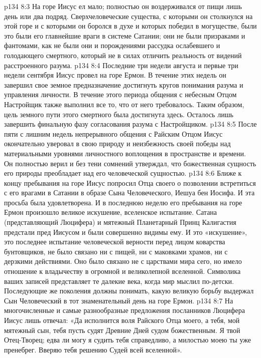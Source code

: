 \vs p134 8:3 \pc На горе Иисус ел мало; полностью он воздерживался от пищи лишь день или два подряд. Сверхчеловеческие существа, с которыми он столкнулся на этой горе и с которыми он боролся в духе и которых победил в могуществе, были  это были его главнейшие враги в системе Сатании; они не были призраками и фантомами, как не были они и порождениями рассудка ослабевшего и голодающего смертного, который не в силах отличить реальность от видений расстроенного разума.
\vs p134 8:4 Последние три недели августа и первые три недели сентября Иисус провел на горе Ермон. В течение этих недель он завершил свое земное предназначение достигнуть кругов понимания разума и управления личности. В течение этого периода общения с небесным Отцом Настройщик также выполнил все то, что от него требовалось. Таким образом, цель земного пути этого смертного была достигнута здесь. Осталось лишь завершить финальную фазу согласования разума с Настройщиком.
\vs p134 8:5 После пяти с лишним недель непрерывного общения с Райским Отцом Иисус окончательно уверовал в свою природу и неизбежность своей победы над материальными уровнями личностного воплощения в пространстве и времени. Он полностью верил и без тени сомнений утверждал, что божественная сущность его природы преобладает над его человеческой сущностью.
\vs p134 8:6 \pc Ближе к концу пребывания на горе Иисус попросил Отца своего о позволении встретиться с его врагами в Сатании в образе Сына Человеческого, Иешуа бен Иосифа. И эта просьба была удовлетворена. И в последнюю неделю его пребывания на горе Ермон произошло великое искушение, вселенское испытание. Сатана (представляющий Люцифера) и мятежный Планетарный Принц Калигастия предстали пред Иисусом и были совершенно видимы ему. И это «искушение», это последнее испытание человеческой верности перед лицом коварства бунтовщиков, не было связано ни с пищей, ни с маковками храмов, ни с дерзкими действиями. Оно было связано не с царствами мира сего, но имело отношение к владычеству в огромной и великолепной вселенной. Символика ваших записей представляет те далекие века, когда мир мыслил по\hyp{}детски. Последующие же поколения должны понимать, какую великую борьбу выдержал Сын Человеческий в тот знаменательный день на горе Ермон.
\vs p134 8:7 На многочисленные и самые разнообразные предложения посланников Люцифера Иисус лишь отвечал: «Да исполнится воля Райского Отца моего, а тебя, мой мятежный сын, тебя пусть судят Древние Дней судом божественным. Я твой Отец\hyp{}Творец; едва ли могу я судить тебя справедливо, а милостью моею ты уже пренебрег. Вверяю тебя решению Судей всей вселенной».
